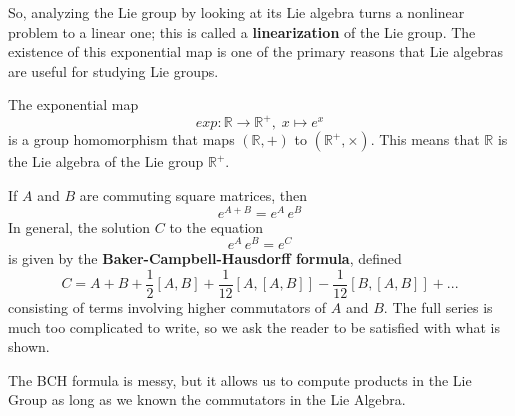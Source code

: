   \begin{center}
  \end{center}
  So, analyzing the Lie group by looking at its Lie algebra turns a nonlinear problem to a linear one; this is called a \textbf{linearization} of the Lie group. The existence of this exponential map is one of the primary reasons that Lie algebras are useful for studying Lie groups. 

  \begin{example}
    The exponential map 
    \begin{equation}
      exp: \mathbb{R} \longrightarrow \mathbb{R}^+, \; x \mapsto e^x
    \end{equation}
    is a group homomorphism that maps $(\mathbb{R}, +)$ to $(\mathbb{R}^+, \times)$. This means that $\mathbb{R}$ is the Lie algebra of the Lie group $\mathbb{R}^+$. 
  \end{example}

  \begin{theorem}
    If $A$ and $B$ are commuting square matrices, then 
    \begin{equation}
      e^{A + B} = e^A \, e^B
    \end{equation}
    In general, the solution $C$ to the equation
    \begin{equation}
      e^{A} \, e^B = e^C
    \end{equation}
    is given by the \textbf{Baker-Campbell-Hausdorff formula}, defined
    \begin{equation}
      C = A + B + \frac{1}{2}[A,B] + \frac{1}{12} [A,[A,B]] - \frac{1}{12} [B,[A,B]] + ...
    \end{equation}
    consisting of terms involving higher commutators of $A$ and $B$. The full series is much too complicated to write, so we ask the reader to be satisfied with what is shown. 
  \end{theorem}

  The BCH formula is messy, but it allows us to compute products in the Lie Group as long as we known the commutators in the Lie Algebra. 

